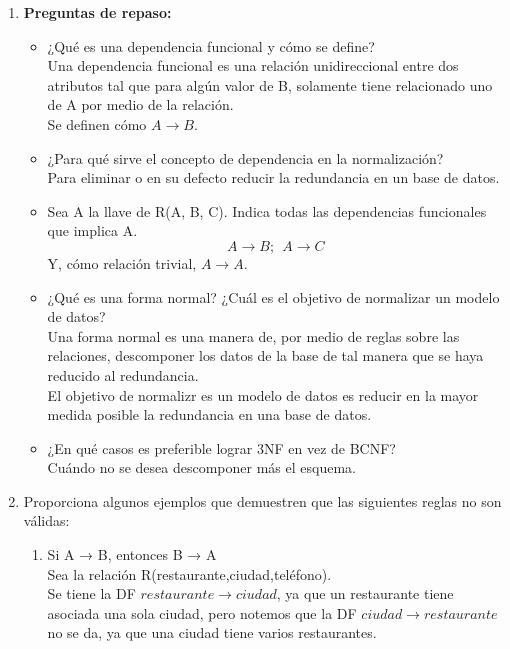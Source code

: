\documentclass[a4paper, 12pt]{report}
\begin{document}
\begin{enumerate}
\item{
    \textbf{Preguntas de repaso:}
    \begin{itemize}
    \item{¿Qué es una dependencia funcional y cómo se define?\\
        Una dependencia funcional es una relación unidireccional entre dos
        atributos tal que para algún valor de B, solamente tiene relacionado uno
        de A por medio de la relación.\\
        Se definen cómo $A\rightarrow B$.
    }
    \item{¿Para qué sirve el concepto de dependencia en la normalización?\\
        Para eliminar o en su defecto reducir la redundancia en un base de datos.
    }
    \item{Sea A la llave de R(A, B, C). Indica todas las dependencias
            funcionales que implica A.\\
        $$A\rightarrow B;\ \ A\rightarrow C$$
        Y, cómo relación trivial, $A\rightarrow A$.
    }
    \item{¿Qué es una forma normal? ¿Cuál es el objetivo de normalizar un modelo
            de datos?\\
        Una forma normal es una manera de, por medio de reglas sobre las
        relaciones, descomponer los datos de la base de tal manera que se haya
        reducido al redundancia.\\
        El objetivo de normalizr es un modelo de datos es reducir en la mayor
        medida posible la redundancia en una base de datos.
    }
    \item{¿En qué casos es preferible lograr 3NF en vez de BCNF?\\
        Cuándo no se desea descomponer más el esquema.
    }
    \end{itemize}
}
\item {Proporciona algunos ejemplos que demuestren que las siguientes reglas
	no son válidas:
\begin{enumerate}
	\item Si A → B, entonces B → A\\
	Sea la relación R(restaurante,ciudad,teléfono).\\
	Se tiene la DF $restaurante \rightarrow ciudad$, ya que un restaurante tiene
	asociada una sola ciudad, pero notemos que la DF $ciudad \rightarrow
	restaurante$ no se da, ya que una ciudad tiene varios restaurantes. \\

\end{enumerate}}
\end{enumerate}
\end{document}
